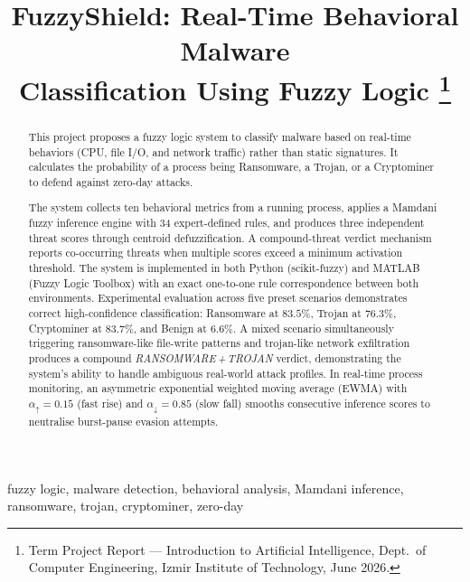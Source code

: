 \documentclass[conference]{IEEEtran}
\begin{document}
\title{FuzzyShield: Real-Time Behavioral Malware\\Classification Using Fuzzy Logic%
\thanks{Term Project Report --- Introduction to Artificial Intelligence,
Dept.\ of Computer Engineering, Izmir Institute of Technology, June 2026.}}

\author{
}

\maketitle

\begin{abstract}
This project proposes a fuzzy logic system to classify malware based on
real-time behaviors (CPU, file I/O, and network traffic) rather than
static signatures. It calculates the probability of a process being
Ransomware, a Trojan, or a Cryptominer to defend against zero-day
attacks.

The system collects ten behavioral metrics from a running process, applies
a Mamdani fuzzy inference engine with 34 expert-defined rules, and
produces three independent threat scores through centroid defuzzification.
A compound-threat verdict mechanism reports co-occurring threats when
multiple scores exceed a minimum activation threshold. The system is
implemented in both Python (scikit-fuzzy) and MATLAB (Fuzzy Logic
Toolbox) with an exact one-to-one rule correspondence between both
environments. Experimental evaluation across five preset scenarios
demonstrates correct high-confidence classification: Ransomware at
$83.5\%$, Trojan at $76.3\%$, Cryptominer at $83.7\%$, and Benign at
$6.6\%$. A mixed scenario simultaneously triggering ransomware-like
file-write patterns and trojan-like network exfiltration produces a
compound \textit{RANSOMWARE\,+\,TROJAN} verdict, demonstrating the
system's ability to handle ambiguous real-world attack profiles.
In real-time process monitoring, an asymmetric exponential weighted
moving average (EWMA) with $\alpha_{\uparrow}{=}0.15$ (fast rise) and
$\alpha_{\downarrow}{=}0.85$ (slow fall) smooths consecutive inference
scores to neutralise burst-pause evasion attempts.
\end{abstract}

\begin{IEEEkeywords}
fuzzy logic, malware detection, behavioral analysis, Mamdani inference,
ransomware, trojan, cryptominer, zero-day
\end{IEEEkeywords}
\end{document}
